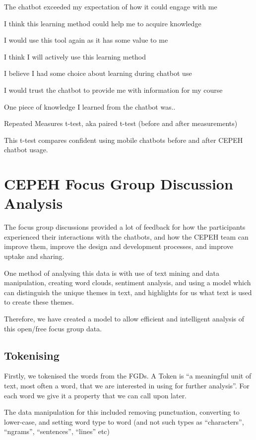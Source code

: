 \documentclass[a4paper, nobind]{templates/ociamthesis}
\begin{document}
The chatbot exceeded my expectation of how it could engage with me

I think this learning method could help me to acquire knowledge

I would use this tool again as it has some value to me

I think I will actively use this learning method

I believe I had some choice about learning during chatbot use

I would trust the chatbot to provide me with information for my course

One piece of knowledge I learned from the chatbot was..

Repeated Measures t-test, aka paired t-test (before and after
measurements)

This t-test compares confident using mobile chatbots before and after
CEPEH chatbot usage.

\hypertarget{cepeh-focus-group-discussion-analysis}{%
\chapter{CEPEH Focus Group Discussion Analysis}\label{cepeh-focus-group-discussion-analysis}}

The focus group discussions provided a lot of feedback for how the
participants experienced their interactions with the chatbots, and how
the CEPEH team can improve them, improve the design and development
processes, and improve uptake and sharing.

One method of analysing this data is with use of text mining and data
manipulation, creating word clouds, sentiment analysis, and using a
model which can distinguish the unique themes in text, and highlights
for us what text is used to create these themes.

Therefore, we have created a model to allow efficient and intelligent
analysis of this open/free focus group data.

\hypertarget{tokenising}{%
\section{Tokenising}\label{tokenising}}

Firstly, we tokenised the words from the FGDs. A Token is ``a meaningful
unit of text, most often a word, that we are interested in using for
further analysis''. For each word we give it a property that we can call
upon later.

The data manipulation for this included removing punctuation, converting
to lower-case, and setting word type to word (and not such types as
``characters'', ``ngrams'', ``sentences'', ``lines'' etc)
\end{document}

